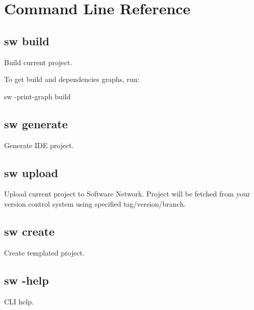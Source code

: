 \section{Command Line Reference}

\subsection{sw build}

Build current project.

To get build and dependencies graphs, run:
\begin{command}
sw -print-graph build
\end{command}

\subsection{sw generate}

Generate IDE project.

\subsection{sw upload}

Upload current project to Software Network.
Project will be fetched from your version control system using specified tag/version/branch.

\subsection{sw create}

Create templated project.

\subsection{sw -help}

CLI help.

